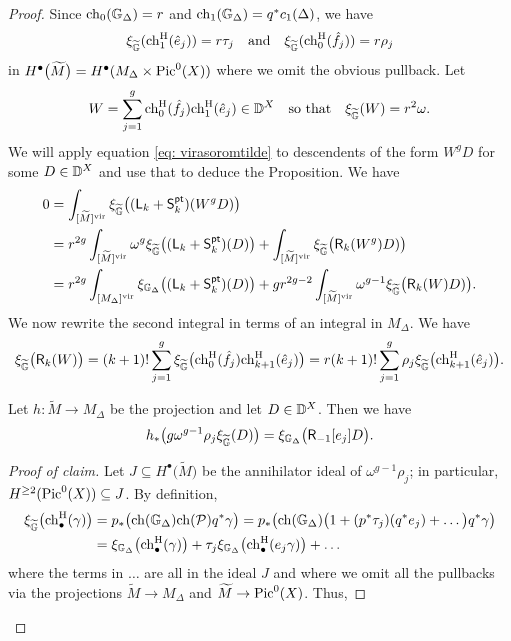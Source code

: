 \documentclass[a4paper, 12pt]{amsart}
\begin{document}
\begin{proof}
 Since $\mathrm{ch}_0({\mathbb{G}}_\Delta)=r$ and $\mathrm{ch}_1({\mathbb{G}}_\Delta)=q^\ast c_1(\Delta)$, we have
\[\xi_{\widetilde {{\mathbb{G}}}}(\mathrm{ch}^{\mathrm{H}}_1(\hat e_j))=r\tau_j \quad \textup{and}\quad \xi_{\widetilde {{\mathbb{G}}}}(\mathrm{ch}^{\mathrm{H}}_0(\hat f_j))=r\rho_j\]
in $H^\bullet\big(\widetilde M\big)=H^\bullet(M_\Delta\times \mathop{\rm Pic}\nolimits^0(X))$ where we omit the obvious pullback. Let
\[W=\sum_{j=1}^g \mathrm{ch}^{\mathrm{H}}_0(\hat f_j)\mathrm{ch}^{\mathrm{H}}_1(\hat e_j)\in {\mathbb{D}}^X\quad \textup{so that}\quad \xi_{\widetilde {{\mathbb{G}}}}(W)=r^2\omega.\]
We will apply equation \eqref{eq: virasoromtilde} to descendents of the form $W^g D$ for some $D\in {\mathbb{D}}^X$ and use that to deduce the Proposition. We have
\begin{align}\label{eq: virasoroMtilde2}
0&=\int_{[\widetilde M]^{\mathrm{vir}}}\xi_{\widetilde {{\mathbb{G}}}}\big(({\mathsf{L}}_k+{\mathsf{S}}_k^{\mathsf{pt}})(W^g D)\big)\\
&=r^{2g}\int_{[\widetilde M]^{\mathrm{vir}}}\omega^g \xi_{\widetilde {{\mathbb{G}}}}\big(({\mathsf{L}}_k+{\mathsf{S}}_k^{\mathsf{pt}})(D)\big)+\int_{[\widetilde M]^{\mathrm{vir}}}\xi_{\widetilde {{\mathbb{G}}}}\big(\mathsf{R}_k(W^g) D)\big)\nonumber\\
&=r^{2g}\int_{[M_\Delta]^{\mathrm{vir}}}\xi_{{\mathbb{G}}_\Delta}\big(({\mathsf{L}}_k+{\mathsf{S}}_k^{\mathsf{pt}})(D)\big)+gr^{2g-2}\int_{[\widetilde M]^{\mathrm{vir}}}\omega^{g-1}\xi_{\widetilde {{\mathbb{G}}}}\big( \mathsf{R}_k(W) D)\big).\nonumber
\end{align}
We now rewrite the second integral in terms of an integral in $M_\Delta$. We have
\[\xi_{\widetilde{{\mathbb{G}}}}\big(\mathsf{R}_k(W)\big)=(k+1)!\sum_{j=1}^g \xi_{\widetilde{{\mathbb{G}}}}\big(\mathrm{ch}^{\mathrm{H}}_0(\hat f_j)\mathrm{ch}^{\mathrm{H}}_{k+1}(\hat e_j)\big)=r(k+1)!\sum_{j=1}^g \rho_j\xi_{\widetilde{{\mathbb{G}}}}\big(\mathrm{ch}^{\mathrm{H}}_{k+1}(\hat e_j)\big).\]
\begin{claim}
Let $h\colon \widetilde M\to M_\Delta$ be the projection and let $D\in {\mathbb{D}}^X$. Then we have
\[h_\ast\big(g\omega^{g-1}\rho_j\xi_{\widetilde {{\mathbb{G}}}}(D)\big)=\xi_{{\mathbb{G}}_\Delta}\big(\mathsf{R}_{-1}[e_j]D\big).\]
\end{claim}\begin{proof}[Proof of claim]
Let $J\subseteq H^\bullet\big(\widetilde M\big)$ be the annihilator ideal of $\omega^{g-1}\rho_j$; in particular, $H^{\geq 2}(\mathop{\rm Pic}\nolimits^0(X))\subseteq J$. By definition,
\begin{align*}
\xi_{\widetilde {{\mathbb{G}}}}\big(\mathrm{ch}^{\mathrm{H}}_\bullet(\gamma)\big)&=p_\ast\big(\mathrm{ch}({\mathbb{G}}_\Delta)\mathrm{ch}({\mathcal P})q^\ast \gamma\big)=p_\ast\big(\mathrm{ch}({\mathbb{G}}_\Delta)\big(1+(p^\ast \tau_j) (q^\ast e_j)+\ldots\big)q^\ast \gamma\big)\\
&=\xi_{{\mathbb{G}}_\Delta}\big(\mathrm{ch}^{\mathrm{H}}_\bullet(\gamma)\big)+\tau_j\xi_{{\mathbb{G}}_\Delta}\big(\mathrm{ch}^{\mathrm{H}}_\bullet(e_j\gamma)\big)+\ldots
\end{align*}
where the terms in $\ldots$ are all in the ideal $J$ and where we omit all the pullbacks via the projections $\widetilde M\to M_\Delta$ and $\widetilde M\to \mathop{\rm Pic}\nolimits^0(X)$. Thus,

\end{proof}
\end{proof}
\end{document}
